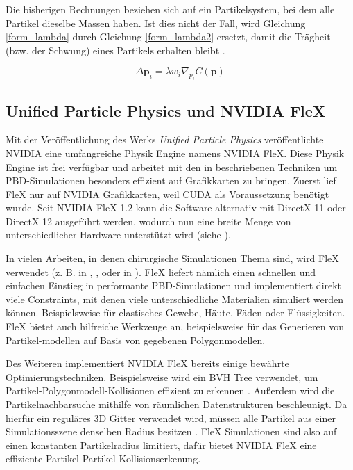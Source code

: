 Die bisherigen Rechnungen beziehen sich auf ein Partikelsystem, bei dem alle Partikel dieselbe Massen haben. Ist dies nicht der Fall, wird Gleichung \ref{form_lambda} durch Gleichung \ref{form_lambda2} ersetzt, damit die Trägheit (bzw. der Schwung) eines Partikels erhalten bleibt \cite{PBD}.

\begin{equation}
\Delta \textbf{p}_i = \lambda w_i \nabla_{p_i} C(\textbf{p})
\label{form_lambda2}
\end{equation}

\subsection{Unified Particle Physics und NVIDIA FleX}

Mit der Veröffentlichung des Werks \textit{Unified Particle Physics} \cite{UPP} veröffentlichte NVIDIA eine umfangreiche Physik Engine namens NVIDIA FleX.  Diese Physik Engine ist frei verfügbar und arbeitet mit den in \cite{UPP} beschriebenen Techniken um PBD-Simulationen besonders effizient auf Grafikkarten zu bringen.
Zuerst lief FleX nur auf NVIDIA Grafikkarten, weil CUDA als Voraussetzung benötigt wurde. Seit NVIDIA FleX 1.2 kann die Software alternativ mit DirectX 11 oder DirectX 12 ausgeführt werden, wodurch nun eine breite Menge von unterschiedlicher Hardware unterstützt wird (siehe \cite{FlexD3D}).

In vielen Arbeiten, in denen chirurgische Simulationen Thema sind, wird FleX verwendet (z. B. in \cite{BreastBiopsy}, \cite{PBDKidney}, \cite{VRSim20} oder in \cite{VRRobSim}). FleX liefert nämlich einen schnellen und einfachen Einstieg in performante PBD-Simulationen und implementiert direkt viele Constraints, mit denen viele unterschiedliche Materialien simuliert werden können. Beispielsweise für elastisches Gewebe, Häute, Fäden oder Flüssigkeiten. FleX bietet auch hilfreiche Werkzeuge an, beispielsweise für das Generieren von Partikel-modellen auf Basis von gegebenen Polygonmodellen.

Des Weiteren implementiert NVIDIA FleX bereits einige bewährte Optimierungstechniken. Beispielsweise wird ein BVH Tree verwendet, um Partikel-Polygonmodell-Kollisionen effizient zu erkennen \cite{FlexD3D}. Außerdem wird die Partikelnachbarsuche mithilfe von räumlichen Datenstrukturen beschleunigt. Da hierfür ein reguläres 3D Gitter verwendet wird, müssen alle Partikel aus einer Simulationsszene denselben Radius besitzen \cite{UPP}. FleX Simulationen sind also auf einen konstanten Partikelradius limitiert, dafür bietet NVIDIA FleX eine effiziente Partikel-Partikel-Kollisionserkenung.


